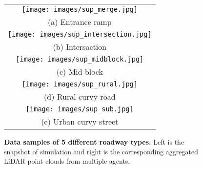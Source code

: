 \documentclass[runningheads]{llncs}
\begin{document}
\begin{figure*}[!ht]
\centering
\footnotesize
\def\xwidth{0.88}
\begin{tabular}{c}
\texttt{[image: images/sup\_merge.jpg]} \\
(a) Entrance ramp \\
\texttt{[image: images/sup\_intersection.jpg]} \\
(b) Intersaction \\
\texttt{[image: images/sup\_midblock.jpg]} \\
(c) Mid-block \\
\texttt{[image: images/sup\_rural.jpg]} \\
(d) Rural curvy road \\
\texttt{[image: images/sup\_sub.jpg]} \\
(e) Urban curvy street\\
\end{tabular}
\caption{\textbf{Data samples of 5 different roadway types.} Left is the snapshot of simulation and right is the corresponding aggregated LiDAR point clouds from multiple agents.}
\label{fig:sample}
\end{figure*}
\end{document}
